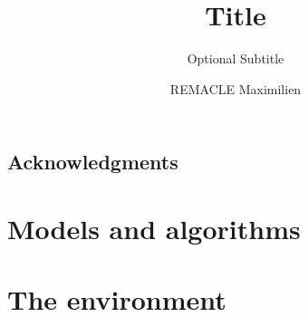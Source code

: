 \documentclass[english]{rmathesis}
\title{Title}
\subtitle{Optional Subtitle}
\author{REMACLE Maximilien}
\begin{document}
	\maketitle
	\frontmatter
	
	\tableofcontents
	\listoffigures
	\listoftables
	\printnomenclature
	\chapter{Acknowledgments}
	\mainmatter
	
	
	\part{Models and algorithms}
	
	
	
	
	
	\part{The environment}
	
	
%	
%	
	
	\appendix
	
	\backmatter
	
\end{document}
